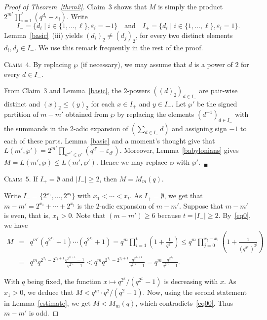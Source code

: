 \documentclass{amsart}
\begin{document}
\begin{proof}[Proof of Theorem~\ref{thrm2}]
\smallskip

Claim~$3$ shows that $M$ is simply the product $2^{m'}\prod_{i=1}^\ell(q^{d_i}-\varepsilon_i)$. Write $$I_-=\{d_i\mid i\in \{1,\ldots,\ell\}, \varepsilon_i=-1\}\quad \textrm{and}\quad I_+=\{d_i\mid i\in \{1,\ldots,\ell\},\varepsilon_i=1\}.$$ Lemma~\ref{basic}~(iii) yields $(d_i)_2\neq (d_j)_2$, for every two distinct elements $d_i,d_j\in I_-$. We use this remark frequently in the rest of the proof.

\smallskip

\noindent\textsc{Claim~$4$. }By replacing $\wp$ (if necessary), we may assume that $d$ is  a power of $2$ for every $d\in I_{-}$.

\smallskip

\noindent From Claim~$3$ and Lemma~\ref{basic}, the $2$-powers $((d)_2)_{d\in I_{-}}$ are pair-wise distinct and $(x)_2 \leq(y)_2$ for each $x\in I_{+}$ and $y\in I_{-}$. Let $\wp'$ be the signed partition of $m-{m'}$ obtained from $\wp$ by replacing the elements $(d^{-1})_{d\in I_{-}}$ with the summands in the $2$-adic expansion of $(\sum_{d\in I_{-}}d)$ and assigning sign $-1$ to each of these parts. Lemma~\ref{basic} and a moment's thought give that $L(m',\wp')=2^{m'}\prod_{d'^{\varepsilon'}\in\wp'}(q^{d'}-\varepsilon_{d'})$. Moreover, Lemma~\ref{babylonians} gives $M=L({m'},\wp)\leq L({m'},\wp')$. Hence we may replace $\wp$  with $\wp'$.~$_\blacksquare$

\smallskip

\noindent\textsc{Claim~$5$. }If $I_+=\emptyset$ and $|I_-|\geq 2$, then $M=M_m(q)$.

\smallskip

\noindent  Write $I_-=\{2^{x_1},\ldots,2^{x_t}\}$ with $x_1<\cdots<x_t$. As $I_+=\emptyset$, we get that $m-m'=2^{x_1}+\cdots+2^{x_t}$ is the $2$-adic expansion of $m-m'$. Suppose that $m-m'$ is even, that is, $x_1>0$. Note that $(m-m')\geq 6$ because $t=|I_-|\geq 2$. By~\eqref{eq0}, we have 
\begin{eqnarray*}
M&=&q^{m'}(q^{2^{x_1}}+1)\cdots (q^{2^{x_t}}+1)=q^m\prod_{i=1}^t\left(1+\frac{1}{q^{2^{x_i}}}\right)\leq q^m\prod_{j=0}^{x_t-x_1}\left(1+\frac{1}{(q^{2^{x_1}})^{2^j}}\right)\\
&=&q^mq^{2^{x_1}-2^{x_t+1}}\frac{q^{2^{x_t+1}}-1}{q^{2^{x_1}}-1}< q^mq^{2^{x_1}-2^{x_t+1}}\frac{q^{2^{x_t+1}}}{q^{2^{x_1}}-1}=q^m\frac{q^{2^{x_1}}}{q^{2^{x_1}}-1}.
\end{eqnarray*}

With $q$ being fixed, the function $x\mapsto q^{2^x}/(q^{2^{x}}-1)$ is decreasing with $x$. As $x_1>0$, we deduce that $M<q^m\cdot q^2/(q^2-1)$. Now, using the second statement in Lemma~\ref{estimate}, we get $M<M_{m}(q)$, which contradicts~\eqref{eq00}. Thus $m-m'$ is odd.


\end{proof}
\end{document}
